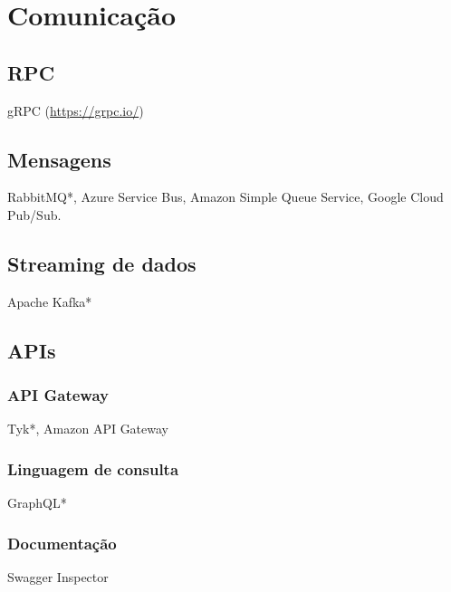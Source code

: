 \section{Comunicação}

\subsection{RPC}
gRPC (\url{https://grpc.io/})

\subsection{Mensagens}
RabbitMQ*, Azure Service Bus, Amazon Simple Queue Service, Google Cloud Pub/Sub.

\subsection{Streaming de dados}
Apache Kafka*

\subsection{APIs}

\subsubsection{API Gateway}
Tyk*, Amazon API Gateway

\subsubsection{Linguagem de consulta}
GraphQL*

\subsubsection{Documentação}
Swagger Inspector


